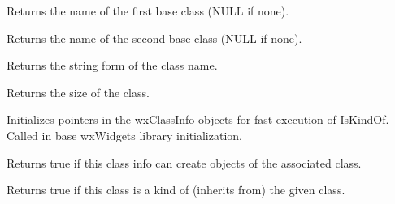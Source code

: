 Returns the name of the first base class (NULL if none).

\label{wxclassinfogetbaseclassname2}


Returns the name of the second base class (NULL if none).

\label{wxclassinfogetclassname}


Returns the string form of the class name.

\label{wxclassinfogetsize}


Returns the size of the class.

\label{wxclassinfoinitializeclasses}


Initializes pointers in the wxClassInfo objects for fast execution
of IsKindOf. Called in base wxWidgets library initialization.

\label{wxclassinfoisdynamic}


Returns true if this class info can create objects of the associated class.

\label{wxclassinfoiskindof}


Returns true if this class is a kind of (inherits from) the given class.


